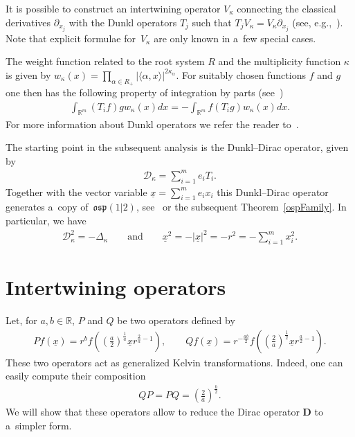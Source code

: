 \documentclass[pdftex]{sigma}
\numberwithin{equation}{section}
\numberwithin{theorem}{section}
\numberwithin{proposition}{section}
\numberwithin{lemma}{section}
\numberwithin{corollary}{section}
\numberwithin{definition}{section}
\numberwithin{example}{section}
\numberwithin{remark}{section}
\numberwithin{note}{section}
\theoremstyle{remark}
\newcommand{\mR}{\mathbb{R}}
\newcommand{\cD}{\mathcal{D}}
\newcommand{\dD}{\textbf{D}}
\newcommand{\ux}{\underline{x}}
\def\k{{\kappa}}
\begin{document}
It is possible to construct an intertwining operator $V_{\k}$ connecting the classical derivatives
$\partial_{x_{j}}$ with the Dunkl operators $T_{j}$ such that $T_{j}V_{\k}=V_{\k}
\partial_{x_{j}}$ (see, e.g.,~\cite{MR1273532}).
Note that explicit formulae for~$V_{\k}$ are only known in a~few special cases.

The weight function related to the root system $R$ and the multiplicity function $\k$ is given by
$w_{\k}(x)=\prod\limits_{\alpha\in R_{+}}|\langle\alpha,x\rangle|^{2\k_{\alpha}}$.
For suitably chosen functions $f$ and $g$ one then has the following property of integration by
parts (see~\cite{Du4})
\begin{gather}
\int_{\mR^{m}}(T_{i}f)g w_{\k}(x)dx=-\int_{\mR^{m}}f\left(T_{i}g\right)w_{\k}(x)dx.
\label{skewnessDunkl}
\end{gather}
For more information about Dunkl operators we refer the reader to~\cite{MR1827871, MR2022853}.

The starting point in the subsequent analysis is the Dunkl--Dirac operator, given by
\begin{gather*}
\cD_{\k}=\sum_{i=1}^{m}e_{i}T_{i}.
\end{gather*}
Together with the vector variable $\ux=\sum\limits_{i=1}^{m}e_{i}x_{i}$ this Dunkl--Dirac operator
generates a~copy of~$\mathfrak{osp}(1|2)$, see~\cite{Orsted} or the subsequent Theorem~\ref{ospFamily}.
In particular, we have
\begin{gather*}
\cD_{\k}^{2}=-\Delta_{\k}\qquad\text{and}\qquad\ux^{2}=-|\ux|^{2}=-r^{2}=-
\sum_{i=1}^{m}x_{i}^{2}.
\end{gather*}

\section{Intertwining operators}\label{section3}

Let, for $a,b\in\mR$, $P$ and $Q$ be two operators def\/ined by
\begin{gather*}
P f(\ux)=r^{b}f\left(\left(\frac{a}{2}\right)^{\frac{1}{a}}\ux r^{\frac{2}{a}-1}\right),\qquad
Q f(\ux)=r^{-\frac{ab}{2}}f\left(\left(\frac{2}{a}\right)^{\frac{1}{2}}\ux r^{\frac{a}{2}-1}\right).
\end{gather*}
These two operators act as generalized Kelvin transformations.
Indeed, one can easily compute their composition
\begin{gather*}
Q P=P Q=\left(\frac{2}{a}\right)^{\frac{b}{2}}.
\end{gather*}
We will show that these operators allow to reduce the Dirac operator $\dD$ to a~simpler form.
\end{document}
